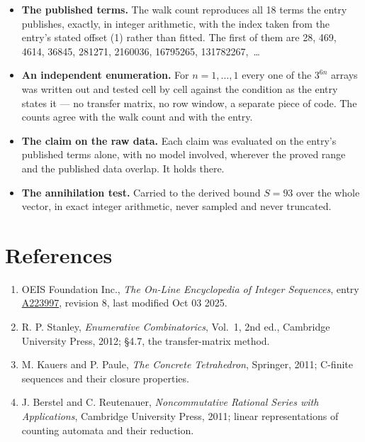 \documentclass[11pt]{article}
\theoremstyle{definition}
\begin{document}
\begin{itemize}

\item {\bfseries The published terms.} The walk count reproduces all 18 terms the entry publishes, exactly, in integer arithmetic, with the index taken from the entry's stated offset (1) rather than fitted. The first of them are 28, 469, 4614, 36845, 281271, 2160036, 16795265, 131782267,~\dots

\item {\bfseries An independent enumeration.} For $n = 1,\dots,1$ every one of the $3^{6n}$ arrays was written out and tested cell by cell against the condition as the entry states it --- no transfer matrix, no row window, a separate piece of code. The counts agree with the walk count and with the entry.

\item {\bfseries The claim on the raw data.} Each claim was evaluated on the entry's published terms alone, with no model involved, wherever the proved range and the published data overlap. It holds there.

\item {\bfseries The annihilation test.} Carried to the derived bound $S = 93$ over the whole vector, in exact integer arithmetic, never sampled and never truncated.

\end{itemize}

\section{References}

\begin{enumerate}

\item OEIS Foundation Inc., \emph{The On-Line Encyclopedia of Integer Sequences}, entry \href{https://oeis.org/A223997}{A223997}, revision 8, last modified Oct 03 2025.

\item R. P. Stanley, \emph{Enumerative Combinatorics}, Vol.~1, 2nd ed., Cambridge University Press, 2012; \S4.7, the transfer-matrix method.

\item M. Kauers and P. Paule, \emph{The Concrete Tetrahedron}, Springer, 2011; C-finite sequences and their closure properties.

\item J. Berstel and C. Reutenauer, \emph{Noncommutative Rational Series with Applications}, Cambridge University Press, 2011; linear representations of counting automata and their reduction.

\end{enumerate}
\end{document}
